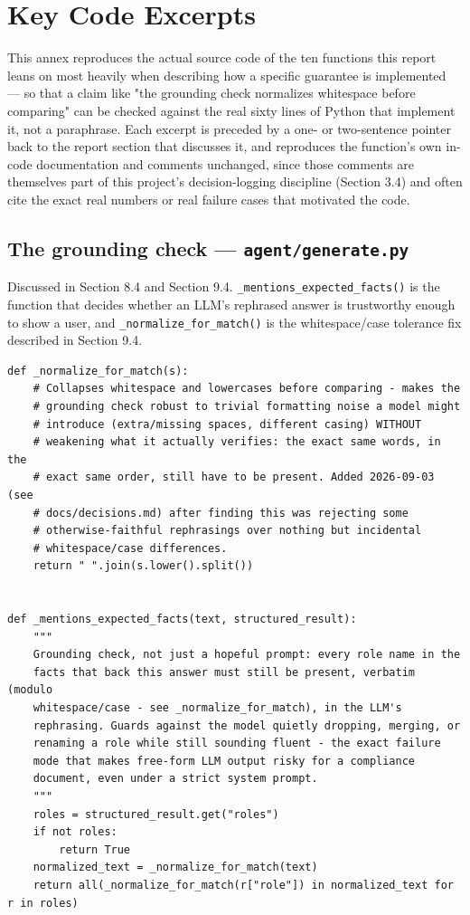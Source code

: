 \chapter{Key Code Excerpts}
\label{ch:key-code-excerpts}
This annex reproduces the actual source code of the ten functions this report leans on most heavily when describing how a specific guarantee is implemented — so that a claim like "the grounding check normalizes whitespace before comparing" can be checked against the real sixty lines of Python that implement it, not a paraphrase. Each excerpt is preceded by a one- or two-sentence pointer back to the report section that discusses it, and reproduces the function's own in-code documentation and comments unchanged, since those comments are themselves part of this project's decision-logging discipline (Section 3.4) and often cite the exact real numbers or real failure cases that motivated the code.

\section{The grounding check — \texttt{agent/\allowbreak{}generate.py}}
Discussed in Section 8.4 and Section 9.4. \texttt{\_\allowbreak{}mentions\_\allowbreak{}expected\_\allowbreak{}facts()} is the function that decides whether an LLM's rephrased answer is trustworthy enough to show a user, and \texttt{\_\allowbreak{}normalize\_\allowbreak{}for\_\allowbreak{}match()} is the whitespace/case tolerance fix described in Section 9.4.

\begin{lstlisting}[caption={agent/generate.py — normalization and the grounding check}]
def _normalize_for_match(s):
    # Collapses whitespace and lowercases before comparing - makes the
    # grounding check robust to trivial formatting noise a model might
    # introduce (extra/missing spaces, different casing) WITHOUT
    # weakening what it actually verifies: the exact same words, in the
    # exact same order, still have to be present. Added 2026-09-03 (see
    # docs/decisions.md) after finding this was rejecting some
    # otherwise-faithful rephrasings over nothing but incidental
    # whitespace/case differences.
    return " ".join(s.lower().split())


def _mentions_expected_facts(text, structured_result):
    """
    Grounding check, not just a hopeful prompt: every role name in the
    facts that back this answer must still be present, verbatim (modulo
    whitespace/case - see _normalize_for_match), in the LLM's
    rephrasing. Guards against the model quietly dropping, merging, or
    renaming a role while still sounding fluent - the exact failure
    mode that makes free-form LLM output risky for a compliance
    document, even under a strict system prompt.
    """
    roles = structured_result.get("roles")
    if not roles:
        return True
    normalized_text = _normalize_for_match(text)
    return all(_normalize_for_match(r["role"]) in normalized_text for r in roles)
\end{lstlisting}
